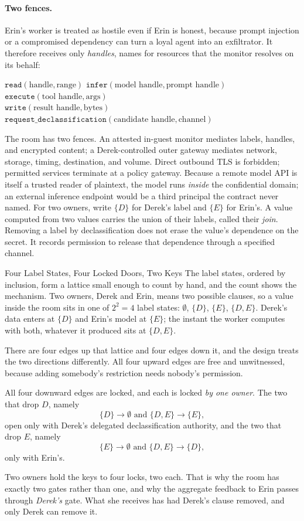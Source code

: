 \documentclass[11pt,a4paper]{article}
\theoremstyle{definition}
\begin{document}
\paragraph{Two fences.}
Erin's worker is treated as hostile even if Erin is honest, because prompt
injection or a compromised dependency can turn a loyal agent into an
exfiltrator. It therefore receives only \emph{handles}, names for resources
that the monitor resolves on its behalf:
\begin{center}\small
$\mathtt{read}(\text{handle},\text{range})$ \quad
$\mathtt{infer}(\text{model handle},\text{prompt handle})$ \quad
$\mathtt{execute}(\text{tool handle},\text{args})$\\[
2pt]
$\mathtt{write}(\text{result handle},\text{bytes})$ \quad
$\mathtt{request\_declassification}(\text{candidate handle},\text{channel})$
\end{center}
The room has two fences. An attested in-guest monitor mediates labels,
handles, and encrypted content; a Derek-controlled outer gateway mediates
network, storage, timing, destination, and volume. Direct outbound TLS is forbidden; permitted services terminate at a
policy gateway. Because a remote model API is itself a trusted reader of
plaintext, the model runs \emph{inside} the confidential domain; an external
inference endpoint would be a third principal the contract never named.
For two owners, write $\{D\}$ for Derek's label and $\{E\}$ for Erin's.
A value computed from two values carries the union of their labels, called
their \emph{join}. Removing a label by declassification does not erase the
value's dependence on the secret. It records permission to release that
dependence through a specified channel.

\begin{pdexample}{Four Label States, Four Locked Doors, Two Keys}
\setlength{\parskip}{4pt plus 1pt}
The label states, ordered by inclusion, form a lattice small enough to count
by hand, and the count shows the mechanism. Two owners, Derek and Erin, means
two possible clauses, so a value inside the room sits in one of $2^2=4$ label
states: $\emptyset$, $\{D\}$, $\{E\}$, $\{D,E\}$. Derek's data enters at $\{D\}$ and
Erin's model at $\{E\}$; the instant the worker computes with both, whatever it
produced sits at $\{D,E\}$.

There are four edges up that lattice and four
edges down it, and the design treats the two directions differently. All four
upward edges are free and unwitnessed, because adding somebody's restriction
needs nobody's permission.

All four downward edges are locked, and each is locked \emph{by one owner}.
The two that drop $D$, namely
\[
\{D\}\to\emptyset\text{ and }\{D,E\}\to\{E\},
\]
open only with Derek's
delegated declassification authority, and the two that drop $E$, namely
\[
\{E\}\to\emptyset\text{ and }\{D,E\}\to\{D\},
\]
only with Erin's.

Two owners hold the keys to four locks, two each. That is why the room has
exactly two gates rather than one, and why the aggregate feedback to Erin passes through
\emph{Derek's} gate. What she receives has had Derek's clause removed, and
only Derek can remove it.
\end{pdexample}
\end{document}
